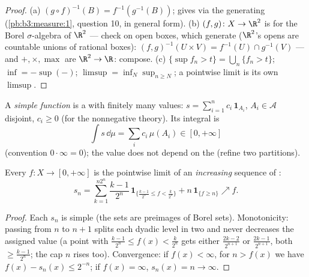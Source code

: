 \begin{proof}
(a) $(g\circ f)^{-1}(B) = f^{-1}(g^{-1}(B))$;  gives
 via the generating 
(\cref{pb:b3:measure:1}, question 10, in general form).
(b) $(f, g) \colon X \to \R^2$ is  for the Borel
$\sigma$-algebra of $\R^2$ --- check on open boxes, which
generate ($\R^2$'s opens are countable unions of rational
boxes): $(f,g)^{-1}(U\times V) = f^{-1}(U)\cap g^{-1}(V)$ ---
and $+, \times, \max$ are  $\R^2 \to \R$: compose.
(c) $\{\sup f_n > t\} = \bigcup_n\{f_n > t\}$; $\inf = -\sup(-)$;
$\limsup = \inf_N\sup_{n \geq N}$; a pointwise limit is its own
$\limsup$.
\end{proof}

\begin{definition}\label{def:b3:lebesgue:simple}
A \emph{simple function} is a  with finitely many values: $s = \sum_{i=1}^n
c_i\,\mathbf 1_{A_i}$, $A_i \in \mathcal A$ disjoint, $c_i \geq
0$ (for the nonnegative theory). Its integral is
\[
\int s\,\dd\mu = \sum_i c_i\,\mu(A_i) \in [0, +\infty]
\]
(convention $0\cdot\infty = 0$); the value does not depend on
the  (refine two partitions).
\end{definition}

\begin{theorem}
\label{thm:b3:lebesgue:approximation}
Every  $f \colon X \to [0, +\infty]$ is the pointwise
limit of an \emph{increasing} sequence of :
\[
s_n = \sum_{k=1}^{n2^n} \frac{k-1}{2^n}\,
\mathbf 1_{\{\frac{k-1}{2^n} \leq f < \frac k{2^n}\}}
+ n\,\mathbf 1_{\{f \geq n\}} \nearrow f .
\]
\end{theorem}

\begin{proof}
Each $s_n$ is simple (the sets are preimages of Borel sets).
Monotonicity: passing from $n$ to $n+1$ splits each dyadic
level in two and never decreases the assigned value (a point
with $\frac{k-1}{2^n} \leq f(x) < \frac k{2^n}$ gets either
$\frac{2k-2}{2^{n+1}}$ or $\frac{2k-1}{2^{n+1}}$, both $\geq
\frac{k-1}{2^n}$; the cap $n$ rises too). Convergence: if
$f(x) < \infty$, for $n > f(x)$ we have $f(x) - s_n(x) \leq
2^{-n}$; if $f(x) = \infty$, $s_n(x) = n \to \infty$.
\end{proof}


